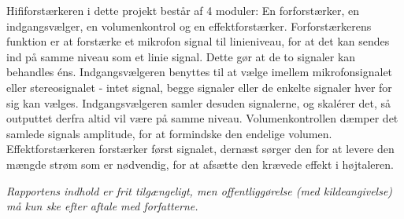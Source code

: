 \begin{multicols}{2}
{\begin{minipage}{2.8in}
Hififorstærkeren i dette projekt består af 4 moduler: En forforstærker, en indgangsvælger, en volumenkontrol og en effektforstærker. Forforstærkerens funktion er at forstærke et mikrofon signal til linieniveau, for at det kan sendes ind på samme niveau som et linie signal. Dette gør at de to signaler kan behandles éns.
Indgangsvælgeren benyttes til at vælge imellem mikrofonsignalet eller stereosignalet - intet signal, begge signaler eller de enkelte signaler hver for sig kan vælges. Indgangsvælgeren samler desuden signalerne, og skalérer det, så outputtet derfra altid vil være på samme niveau.
Volumenkontrollen dæmper det samlede signals amplitude, for at formindske den endelige volumen.
Effektforstærkeren forstærker først signalet, dernæst sørger den for at levere den mængde strøm som er nødvendig, for at afsætte den krævede effekt i højtaleren.
\end{minipage}}
\newline
\end{multicols}
\textit{\scriptsize{Rapportens indhold er frit tilgængeligt, men offentliggørelse (med kildeangivelse) må kun ske efter aftale med forfatterne.}}